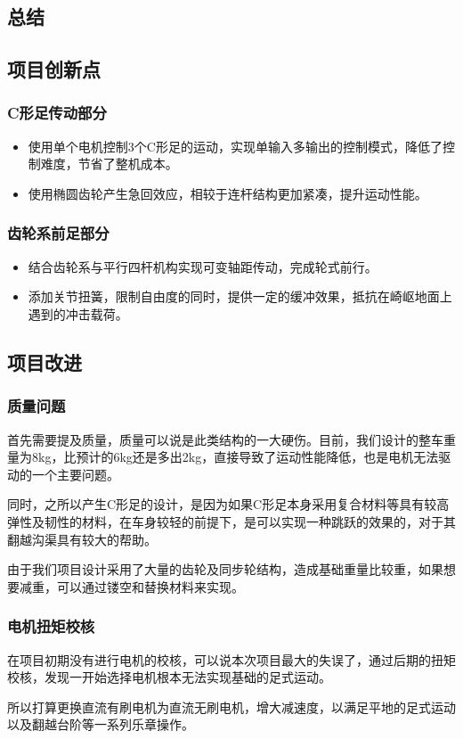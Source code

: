 \documentclass[12pt]{article}
\begin{document}
\begin{CJK}{UTF8}{song}
\section{总结}
\subsection{项目创新点}
\subsubsection{C形足传动部分}
\begin{itemize}
\item 使用单个电机控制3个C形足的运动，实现单输入多输出的控制模式，降低了控制难度，节省了整机成本。
\item 使用椭圆齿轮产生急回效应，相较于连杆结构更加紧凑，提升运动性能。
\end{itemize}
\subsubsection{齿轮系前足部分}
\begin{itemize}
\item 结合齿轮系与平行四杆机构实现可变轴距传动，完成轮式前行。
\item 添加关节扭簧，限制自由度的同时，提供一定的缓冲效果，抵抗在崎岖地面上遇到的冲击载荷。
\end{itemize}
\subsection{项目改进}
\subsubsection{质量问题}
首先需要提及质量，质量可以说是此类结构的一大硬伤。目前，我们设计的整车重量为8kg，比预计的6kg还是多出2kg，直接导致了运动性能降低，也是电机无法驱动的一个主要问题。\par
同时，之所以产生C形足的设计，是因为如果C形足本身采用复合材料等具有较高弹性及韧性的材料，在车身较轻的前提下，是可以实现一种跳跃的效果的，对于其翻越沟渠具有较大的帮助。\par
由于我们项目设计采用了大量的齿轮及同步轮结构，造成基础重量比较重，如果想要减重，可以通过镂空和替换材料来实现。

\subsubsection{电机扭矩校核}
在项目初期没有进行电机的校核，可以说本次项目最大的失误了，通过后期的扭矩校核，发现一开始选择电机根本无法实现基础的足式运动。\par
所以打算更换直流有刷电机为直流无刷电机，增大减速度，以满足平地的足式运动以及翻越台阶等一系列乐章操作。


\end{CJK}
\end{document}
